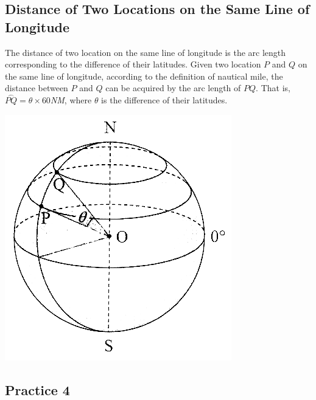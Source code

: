 \documentclass{report}
\begin{document}
\begin{multicols}{2}
    \section{Distance of Two Locations on the Same Line of Longitude}

    The distance of two location on the same line of longitude is the arc length
    corresponding to the difference of their latitudes. Given two location $P$ and
    $Q$ on the same line of longitude, according to the definition of nautical
    mile, the distance between $P$ and $Q$ can be acquired by the arc length of
    $PQ$. That is, $\overset{\frown}{PQ} = \theta \times 60$\emph{NM}, where
    $\theta$ is the difference of their latitudes.

    \begin{center}
        \includegraphics[scale=1.4]{longitude difference.png}
    \end{center}

    \subsection{Practice 4}


\end{multicols}
\end{document}
